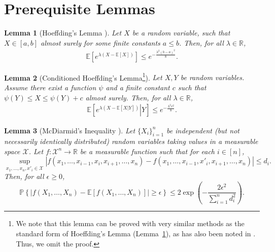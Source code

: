 \documentclass[onecolumn,romanappendices,10pt]{IEEEtran}
\newtheorem{lemma}{Lemma}
\newcommand{\Xcal}{{\mathcal X}}
\newcommand{\EE}{{\mathbb{E}}}
\newcommand{\PP}{{\mathbb{P}}}
\newcommand{\RR}{{\mathbb{R}}}
\begin{document}
	\newpage
	
	{
		
		
	}
	
	\onecolumn
	\appendices
	
	\section{Prerequisite Lemmas} \label{app:lemmas}
	\begin{lemma}[Hoeffding's Lemma {\cite[Lemma~2.2.1]{raginsky2013concentration}}] \label{lem:Hoeffding}
		Let $X$ be a random variable, such that $X \in [a, b]$ almost surely for some finite constants $a \leq b$. Then, for all $\lambda \in \RR$,
		\begin{equation}
			\begin{aligned}
				\EE \left[ e^{\lambda \left( X - \EE [X] \right)} \right] \leq e^{-\frac{\lambda^2 (b-a)^2}{8}}.
			\end{aligned}
		\end{equation}
	\end{lemma}
	
	\begin{lemma}[Conditioned Hoeffding's Lemma\footnote{We note that this lemma can be proved with very similar methods as the standard form of Hoeffding's Lemma (Lemma~\ref{lem:Hoeffding}), as has also been noted in {\cite[Lemma~1]{lecturenote}}. Thus, we omit the proof.}] \label{lem:con-Hoeffding}
		Let $X, Y$ be random variables. Assume there exist a function $\psi$ and a finite constant $c$ such that $\psi(Y) \leq X \leq \psi(Y) + c$ almost surely. Then, for all $\lambda \in \RR$,
		\begin{equation}
			\begin{aligned}
				\EE \left[ \left. e^{\lambda \left( X - \EE [X | Y] \right)} \right| Y \right] \leq e^{-\frac{\lambda^2 c^2}{8}}.
			\end{aligned}
		\end{equation}
	\end{lemma}
	
	\begin{lemma}[McDiarmid's Inequality {\cite[Theorem~2.2.2]{raginsky2013concentration}}] \label{lem:McDiarmid}
		Let $\{X_i\}_{i=1}^n$ be independent (but not necessarily identically distributed) random variables taking values in a measurable space $\Xcal$. Let $f : \Xcal^n \to \RR$ be a measurable function such that for each $i \in [n]$,
		\begin{equation*}
			\sup\limits_{x_1,\ldots,x_n,x'_i \in \Xcal} \left| f(x_1, \ldots, x_{i-1}, x_i, x_{i+1}, \ldots, x_n) - f(x_1, \ldots, x_{i-1}, x'_i, x_{i+1}, \ldots, x_n) \right| \leq d_i.
		\end{equation*}
		Then, for all $\epsilon \geq 0$,
		\begin{equation}
			\PP \left\{ \left| f(X_1, \ldots, X_n) - \EE \left[ f(X_1, \ldots, X_n) \right] \right| \geq \epsilon \right\} \leq 2 \exp\left( - \frac{2 \epsilon^2}{\sum_{i=1}^n d_i^2} \right).
		\end{equation}
	\end{lemma}
	
\end{document}
